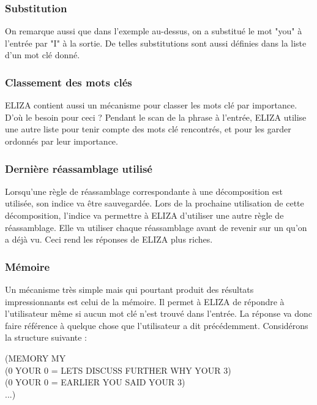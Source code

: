 \documentclass[11pt, a4paper]{report}
\begin{document}
  \subsubsection*{Substitution}
  On remarque aussi que dans l'exemple au-dessus, on a substitué le mot "you" à l'entrée par "I"
  à la sortie. De telles substitutions sont aussi définies dans la liste d'un mot clé donné.  
  
  \subsubsection*{Classement des mots clés}
  ELIZA contient aussi un mécanisme pour classer les mots clé par importance. D'où le besoin 
  pour ceci ?  Pendant le scan de la phrase à l'entrée, 
  ELIZA utilise une autre liste pour tenir compte des mots clé rencontrés, et pour les garder 
  ordonnés par leur importance.
  
  \subsubsection*{Dernière réassamblage utilisé}
  Lorsqu'une règle de réassamblage correspondante à une décomposition 
  est utilisée, son indice va être sauvegardée. 
  Lors de la prochaine utilisation de cette décomposition, l'indice 
  va permettre à ELIZA d'utiliser une autre règle de réassamblage. 
  Elle va utiliser chaque réassamblage avant de revenir sur un qu'on a déjà vu. 
  Ceci rend les réponses de ELIZA plus riches.
  
  \subsubsection*{Mémoire}
  Un mécanisme très simple mais qui pourtant produit des résultats impressionnants est celui 
  de la mémoire. Il permet à ELIZA de répondre à l'utilisateur même si aucun mot clé n'est trouvé 
  dans l'entrée. La réponse va donc faire référence à quelque chose que l'utilisateur a dit 
  précédemment. Considérons la structure suivante : 

  \begin{center}
    (MEMORY MY \\
    (0 YOUR 0 = LETS DISCUSS FURTHER WHY YOUR 3) \\
    (0 YOUR 0 = EARLIER YOU SAID YOUR 3) \\
    ...)
  \end{center}
\end{document}
